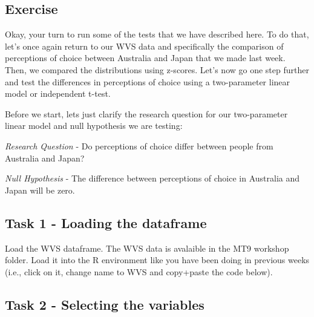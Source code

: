 \documentclass[
]{article}
\newenvironment{Shaded}{\begin{snugshade}}{\end{snugshade}}
\newcommand{\CommentTok}[1]{\textcolor[rgb]{0.56,0.35,0.01}{\textit{#1}}}
\newcommand{\FunctionTok}[1]{\textcolor[rgb]{0.13,0.29,0.53}{\textbf{#1}}}
\newcommand{\NormalTok}[1]{#1}
\newcommand{\OtherTok}[1]{\textcolor[rgb]{0.56,0.35,0.01}{#1}}
\newcommand{\SpecialCharTok}[1]{\textcolor[rgb]{0.81,0.36,0.00}{\textbf{#1}}}
\newcommand{\StringTok}[1]{\textcolor[rgb]{0.31,0.60,0.02}{#1}}
\begin{document}
\subsection{Exercise}\label{exercise}

Okay, your turn to run some of the tests that we have described here. To
do that, let's once again return to our WVS data and specifically the
comparison of perceptions of choice between Australia and Japan that we
made last week. Then, we compared the distributions using z-scores.
Let's now go one step further and test the differences in perceptions of
choice using a two-parameter linear model or independent t-test.

Before we start, lets just clarify the research question for our
two-parameter linear model and null hypothesis we are testing:

\emph{Research Question} - Do perceptions of choice differ between
people from Australia and Japan?

\emph{Null Hypothesis} - The difference between perceptions of choice in
Australia and Japan will be zero.

\subsection{Task 1 - Loading the
dataframe}\label{task-1---loading-the-dataframe}

Load the WVS dataframe. The WVS data is avalaible in the MT9 workshop
folder. Load it into the R environment like you have been doing in
previous weeks (i.e., click on it, change name to WVS and copy+paste the
code below).

\begin{Shaded}
\end{Shaded}

\subsection{Task 2 - Selecting the
variables}\label{task-2---selecting-the-variables}
\end{document}
